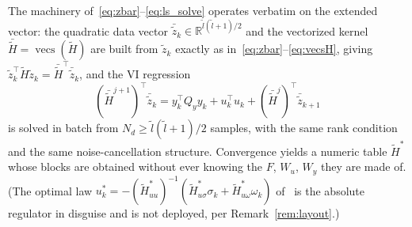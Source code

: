 \documentclass[final,5p,times]{elsarticle}
\theoremstyle{plain}
\theoremstyle{definition}
\theoremstyle{remark}
\DeclareMathOperator{\vecs}{vecs}
\newcommand{\R}{\mathbb{R}}
\begin{document}
The machinery of~\eqref{eq:zbar}--\eqref{eq:ls_solve} operates verbatim on the extended vector: the quadratic data vector $\bar{\tilde{z}}_k \in \R^{\tilde{l}(\tilde{l}+1)/2}$ and the vectorized kernel $\bar{\tilde{H}} = \vecs(\tilde{H})$ are built from $\tilde{z}_k$ exactly as in~\eqref{eq:zbar}--\eqref{eq:vecsH}, giving $\tilde{z}_k^\top \tilde{H} \tilde{z}_k = \bar{\tilde{H}}^\top \bar{\tilde{z}}_k$, and the VI regression
\begin{equation}
(\bar{\tilde{H}}^{j+1})^\top \bar{\tilde{z}}_k = y_k^\top Q_y y_k + u_k^\top u_k + (\bar{\tilde{H}}^{j})^\top \bar{\tilde{z}}_{k+1}
\label{eq:of_vi}
\end{equation}
is solved in batch from $N_d \geq \tilde{l}(\tilde{l}+1)/2$ samples, with the same rank condition and the same noise-cancellation structure. Convergence yields a numeric table $\tilde{H}^*$ whose blocks are obtained without ever knowing the $F$, $W_u$, $W_y$ they are made of. (The optimal law $u_k^* = -(\tilde{H}_{uu}^*)^{-1}(\tilde{H}_{u\sigma}^* \sigma_k + \tilde{H}_{u\omega}^* \omega_k)$ of~\cite[Thm.~2.5]{rizvi2022} is the absolute regulator in disguise and is not deployed, per Remark~\ref{rem:layout}.)
\end{document}
